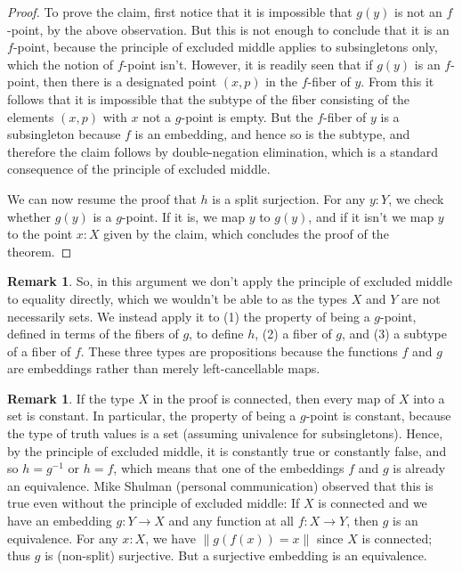 \documentclass{article}
\theoremstyle{definition}
\newtheorem{remark}[theorem]{Remark}
\begin{document}
\begin{proof}
To prove the claim, first notice that it is impossible that $g(y)$ is
not an $f$-point, by the above observation. But this is not enough to
conclude that it is an $f$-point, because the principle of excluded
middle applies to subsingletons only, which the notion of $f$-point
isn't. However, it is readily seen that if $g(y)$ is an $f$-point,
then there is a designated point $(x,p)$ in the $f$-fiber of $y$. From
this it follows that it is impossible that the subtype of the fiber
consisting of the elements $(x,p)$ with $x$ not a $g$-point is
empty. But the $f$-fiber of $y$ is a subsingleton because $f$ is an
embedding, and hence so is the subtype, and therefore the claim
follows by double-negation elimination, which is a standard
consequence of the principle of excluded middle.

We can now resume the proof that $h$ is a split surjection. For any $y:Y$, we check whether $g(y)$ is a $g$-point. If it is, we map $y$ to $g(y)$, and if it isn't we map $y$ to the point $x : X$ given by the claim, which concludes the proof of the theorem.
\end{proof}

\begin{remark} \label{main:remark} So, in this argument we don't apply
  the principle of excluded middle to equality directly, which we
  wouldn't be able to as the types $X$ and $Y$ are not necessarily
  sets. We instead apply it to (1) the property of being a $g$-point,
  defined in terms of the fibers of $g$, to define $h$, (2) a fiber of
  $g$, and (3) a subtype of a fiber of $f$. These three types are
  propositions because the functions $f$ and $g$ are embeddings rather
  than merely left-cancellable maps.
\end{remark}

\begin{remark}
  If the type $X$ in the proof is connected, then every map of $X$
  into a set is constant. In particular, the property of being a
  $g$-point is constant, because the type of truth values is a set
  (assuming univalence for subsingletons). Hence, by the principle of
  excluded middle, it is constantly true or constantly false, and so
  $h=g^{-1}$ or $h = f$, which means that one of the embeddings $f$
  and $g$ is already an equivalence.  Mike Shulman (personal
  communication) observed that this is true even without the principle
  of excluded middle: If $X$ is connected and we have an embedding
  $g : Y \to X$ and any function at all $f : X \to Y$, then $g$ is an
  equivalence. For any $x:X$, we have
  $\left\lVert g(f(x)) = x \right\rVert$ since $X$ is connected; thus
  $g$ is (non-split) surjective. But a surjective embedding is an
  equivalence.
\end{remark}





\vfill

\end{document}

